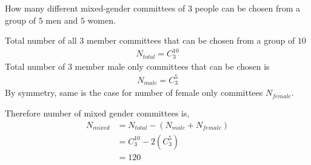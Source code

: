 
%
%
%
%
% 
% 

\question[4] How many different mixed-gender committees of 3 people can be chosen from a group of $5$ men and $5$ women.


\ifprintanswers
\fi 

\begin{solution}[\halfpage]
  Total number of all $3$ member committees that can be chosen from a group of $10$
  \begin{align}
    N_{total} = C^{10}_3 \nonumber
  \end{align}
  Total number of $3$ member male only committees that can be chosen is
  \begin{align}
    N_{male} = C^{5}_3 \nonumber
  \end{align}
  By symmetry, same is the case for number of female only committees $N_{female}$.
  
  Therefore number of mixed gender committees is,
  \begin{align}
    N_{mixed} &= N_{total} - (N_{male}+N_{female}) \nonumber \\
              &= C^{10}_3 - 2(C^5_3) \nonumber \\
              &= 120 \nonumber
  \end{align}
\end{solution}

